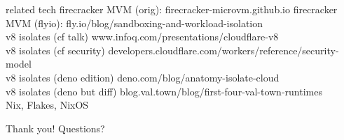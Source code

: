 \documentclass{beamer}
\begin{document}
\begin{frame}{related tech}
    firecracker MVM (orig): firecracker-microvm.github.io
    firecracker MVM (flyio): fly.io/blog/sandboxing-and-workload-isolation\\
    v8 isolates (cf talk) www.infoq.com/presentations/cloudflare-v8 \\
    v8 isolates (cf security)
    developers.cloudflare.com/workers/reference/security-model \\
    v8 isolates (deno edition) deno.com/blog/anatomy-isolate-cloud \\
    v8 isolates (deno but diff) blog.val.town/blog/first-four-val-town-runtimes \\
    Nix, Flakes, NixOS \\

\end{frame}

\begin{frame}{Thank you!}
    Questions? \\
\end{frame}
\end{document}
